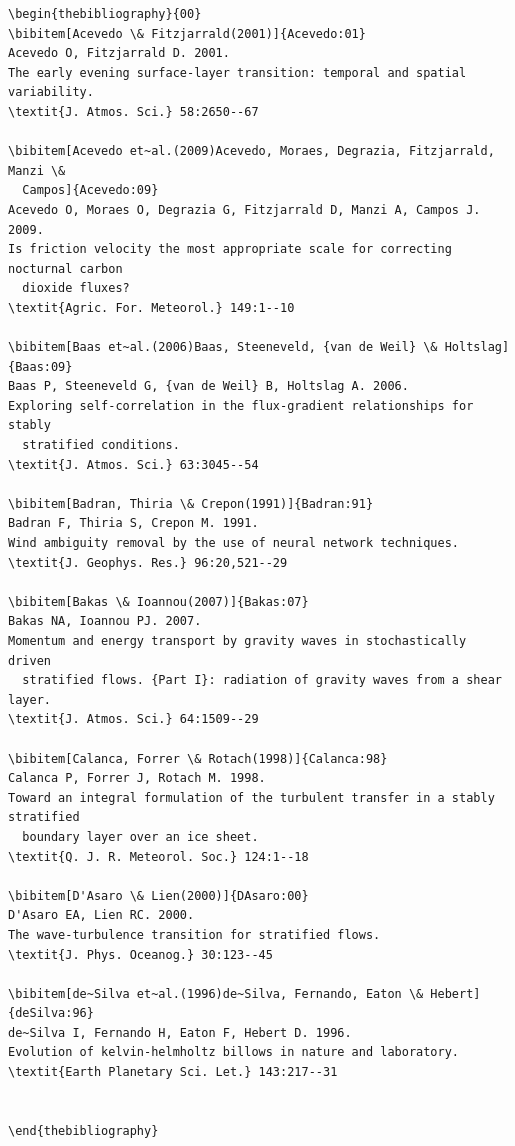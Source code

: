 \documentclass[letterpaper]{ar-1col}
\begin{document}
\begin{verbatim}
\begin{thebibliography}{00}
\bibitem[Acevedo \& Fitzjarrald(2001)]{Acevedo:01}
Acevedo O, Fitzjarrald D. 2001.
The early evening surface-layer transition: temporal and spatial variability.
\textit{J. Atmos. Sci.} 58:2650--67

\bibitem[Acevedo et~al.(2009)Acevedo, Moraes, Degrazia, Fitzjarrald, Manzi \&
  Campos]{Acevedo:09}
Acevedo O, Moraes O, Degrazia G, Fitzjarrald D, Manzi A, Campos J. 2009.
Is friction velocity the most appropriate scale for correcting nocturnal carbon
  dioxide fluxes?
\textit{Agric. For. Meteorol.} 149:1--10

\bibitem[Baas et~al.(2006)Baas, Steeneveld, {van de Weil} \& Holtslag]{Baas:09}
Baas P, Steeneveld G, {van de Weil} B, Holtslag A. 2006.
Exploring self-correlation in the flux-gradient relationships for stably
  stratified conditions.
\textit{J. Atmos. Sci.} 63:3045--54

\bibitem[Badran, Thiria \& Crepon(1991)]{Badran:91}
Badran F, Thiria S, Crepon M. 1991.
Wind ambiguity removal by the use of neural network techniques.
\textit{J. Geophys. Res.} 96:20,521--29

\bibitem[Bakas \& Ioannou(2007)]{Bakas:07}
Bakas NA, Ioannou PJ. 2007.
Momentum and energy transport by gravity waves in stochastically driven
  stratified flows. {Part I}: radiation of gravity waves from a shear layer.
\textit{J. Atmos. Sci.} 64:1509--29

\bibitem[Calanca, Forrer \& Rotach(1998)]{Calanca:98}
Calanca P, Forrer J, Rotach M. 1998.
Toward an integral formulation of the turbulent transfer in a stably stratified
  boundary layer over an ice sheet.
\textit{Q. J. R. Meteorol. Soc.} 124:1--18

\bibitem[D'Asaro \& Lien(2000)]{DAsaro:00}
D'Asaro EA, Lien RC. 2000.
The wave-turbulence transition for stratified flows.
\textit{J. Phys. Oceanog.} 30:123--45

\bibitem[de~Silva et~al.(1996)de~Silva, Fernando, Eaton \& Hebert]{deSilva:96}
de~Silva I, Fernando H, Eaton F, Hebert D. 1996.
Evolution of kelvin-helmholtz billows in nature and laboratory.
\textit{Earth Planetary Sci. Let.} 143:217--31


\end{thebibliography}
\end{verbatim}
\end{document}

